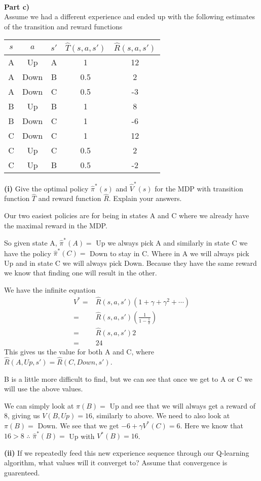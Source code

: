\documentclass[12pt,letter]{article}
\newcommand{\ppart}[1]{\vspace{2mm}\large\textbf{\\Part {#1})\vspace{2mm}}\normalsize\\}
\begin{document}
\ppart{c}
Assume we had a different experience and ended up with the following estimates
of the transition and reward functions
\begin{table}[ht]
\centering
\begin{tabular}{|c|c|c|c|c|}
    \hline
    $s$ & $a$ & $s'$ & $\hat{T}(s,a,s')$ & $\hat{R}(s,a,s')$\\\hline
    A & Up & A & 1 & 12\\\hline
    A & Down & B & 0.5 & 2\\\hline
    A & Down & C & 0.5 & -3\\\hline
    B & Up & B & 1 & 8\\\hline
    B & Down & C & 1 & -6\\\hline
    C & Down & C & 1 & 12\\\hline
    C & Up & C & 0.5 & 2 \\\hline
    C & Up & B & 0.5 & -2\\\hline
\end{tabular}
\end{table}

\textbf{(i)} Give the optimal policy $\hat\pi^*(s)$ and $\hat{V}^*(s)$ for the 
MDP with transition function $\hat{T}$ and reward function $\hat{R}$. Explain 
your answers.

Our two easiest policies are for being in states A and C where we already
have the maximal reward in the MDP.

So given state A, $\hat\pi^*(A)=$ Up we always pick A and similarly in state C we
have the policy $\hat\pi^*(C)=$ Down to stay in C. Where in A we will always pick
Up and in state C we will always pick Down. Because they have the same
reward we know that finding one will result in the other.

We have the infinite equation 
\begin{align*}
    V^*=&\hat{R}(s,a,s')(1 + \gamma + \gamma^2 + \cdots )\\
    =&\hat{R}(s,a,s')\left(\frac{1}{1-\frac12}\right)\\
    =&\hat{R}(s,a,s')2\\
    =&24
\end{align*}
This gives us the value for both A and C, where 
$\hat{R}(A,Up,s')=\hat{R}(C,Down,s')$.

B is a little more difficult to find, but we can see that once we get to A or
C we will use the above values.

We can simply look at $\pi(B)=$ Up and see that we will always get a reward
of 8, giving us $V(B,Up)=16$, similarly to above. We need to also look at 
$\pi(B)=$ Down. We see that we get $-6 + \gamma V^*(C) = 6$. Here we know
that $16>8$ $\therefore$ $\hat\pi^*(B) = $ Up with $V^*(B)=16$.

\vspace{1cm}\textbf{(ii)} If we repeatedly feed this new experience sequence through our 
Q-learning algorithm, what values will it converget to? Assume that 
convergence is guarenteed.
\end{document}
